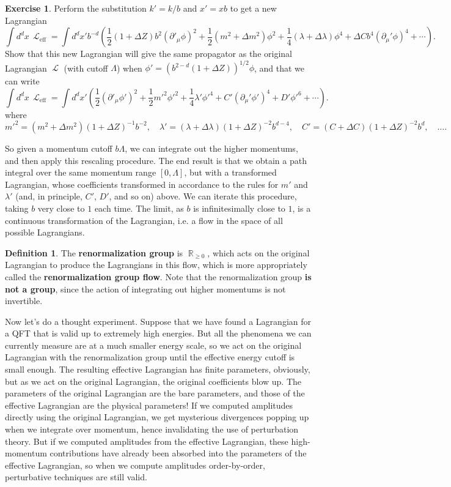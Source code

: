 \documentclass{report}
\theoremstyle{plain}
\theoremstyle{definition}
\newtheorem{definition}[theorem]{Definition}
\newtheorem{exercise}{Exercise}[section]
\theoremstyle{remark}
\DeclareMathOperator{\bR}{\mathbb{R}}
\DeclareMathOperator{\cL}{\mathcal{L}}
\DeclareMathOperator{\eff}{eff}
\begin{document}
\begin{exercise}
  Perform the substitution $k' = k/b$ and $x' = xb$ to get a new
  Lagrangian
  $$ \int d^dx \, \cL_{\eff} = \int d^dx' b^{-d} \left(\frac{1}{2}(1 + \Delta Z)b^2 (\partial'_\mu \phi)^2 + \frac{1}{2} (m^2 + \Delta m^2)\phi^2 + \frac{1}{4} (\lambda + \Delta \lambda) \phi^4 + \Delta C b^4(\partial_\mu' \phi)^4 + \cdots\right). $$
  Show that this new Lagrangian will give the same propagator as the
  original Lagrangian $\cL$ (with cutoff $\Lambda$) when
  $\phi' = (b^{2-d}(1 + \Delta Z))^{1/2}\phi$, and that we can write
  $$ \int d^dx \, \cL_{\eff} = \int d^dx' \left(\frac{1}{2}(\partial'_\mu \phi')^2 + \frac{1}{2} m'^2 \phi'^2 + \frac{1}{4} \lambda' \phi'^4 + C'(\partial_\mu' \phi')^4 + D' \phi'^6 + \cdots\right). $$
  where
  $$ m'^2 = (m^2 + \Delta m^2)(1 + \Delta Z)^{-1}b^{-2}, \quad \lambda' = (\lambda + \Delta \lambda)(1 + \Delta Z)^{-2} b^{d-4}, \quad C' = (C + \Delta C)(1 + \Delta Z)^{-2} b^d, \quad \ldots. $$
\end{exercise}

So given a momentum cutoff $b\Lambda$, we can integrate out the higher
momentums, and then apply this rescaling procedure. The end result is
that we obtain a path integral over the same momentum range
$[0, \Lambda]$, but with a transformed Lagrangian, whose coefficients
transformed in accordance to the rules for $m'$ and $\lambda'$ (and,
in principle, $C'$, $D'$, and so on) above. We can iterate this
procedure, taking $b$ very close to $1$ each time. The limit, as $b$
is infinitesimally close to $1$, is a continuous transformation of the
Lagrangian, i.e. a flow in the space of all possible Lagrangians.

\begin{definition}
  The {\bf renormalization group} is $\bR_{\ge 0}$, which acts on the
  original Lagrangian to produce the Lagrangians in this flow, which
  is more appropriately called the {\bf renormalization group flow}.
  Note that the renormalization group {\bf is not a group}, since the
  action of integrating out higher momentums is not invertible.
\end{definition}

Now let's do a thought experiment. Suppose that we have found a
Lagrangian for a QFT that is valid up to extremely high energies. But
all the phenomena we can currently measure are at a much smaller
energy scale, so we act on the original Lagrangian with the
renormalization group until the effective energy cutoff is small
enough. The resulting effective Lagrangian has finite parameters,
obviously, but as we act on the original Lagrangian, the original
coefficients blow up. The parameters of the original Lagrangian are
the bare parameters, and those of the effective Lagrangian are the
physical parameters! If we computed amplitudes directly using the
original Lagrangian, we get mysterious divergences popping up when we
integrate over momentum, hence invalidating the use of perturbation
theory. But if we computed amplitudes from the effective Lagrangian,
these high-momentum contributions have already been absorbed into the
parameters of the effective Lagrangian, so when we compute amplitudes
order-by-order, perturbative techniques are still valid.
\end{document}
